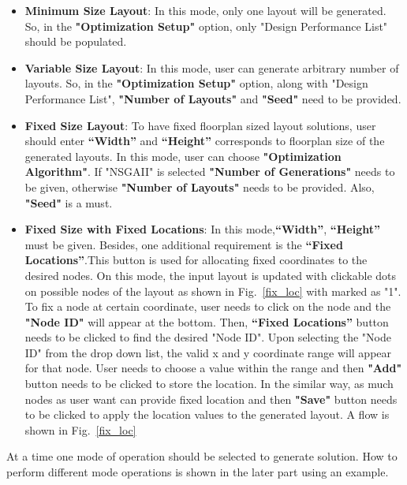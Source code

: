 \documentclass[11pt]{article}
\begin{document}
\begin{itemize}
    \item \textbf{Minimum Size Layout}: In this mode, only one layout will be generated. So, in the \textbf{"Optimization Setup"} option, only "Design Performance List" should be populated.
    \item \textbf{Variable Size Layout}: In this mode, user can generate arbitrary number of layouts. So, in the \textbf{"Optimization Setup"} option, along with "Design Performance List", \textbf{"Number of Layouts"} and \textbf{"Seed"} need to be provided.
    \item \textbf{Fixed Size Layout}: To have fixed floorplan sized layout solutions, user should enter \textbf{“Width”} and \textbf{“Height”} corresponds to floorplan size of the generated layouts. In this mode, user can choose \textbf{"Optimization Algorithm"}. If "NSGAII" is selected \textbf{"Number of Generations"} needs to be given, otherwise \textbf{"Number of Layouts"} needs to be provided. Also, \textbf{"Seed"} is a must.
    \item \textbf{Fixed Size with Fixed Locations}: In this mode,\textbf{“Width”}, \textbf{“Height”} must be given. Besides, one additional requirement is the \textbf{“Fixed Locations”}.This button is used for allocating fixed coordinates to the desired nodes. On this mode, the input layout is updated with clickable dots on possible nodes of the layout as shown in Fig.~\ref{fix_loc} with marked as "1". To fix a node at certain coordinate, user needs to click on the node and the \textbf{"Node ID"} will appear at the bottom. Then, \textbf{“Fixed Locations”} button needs to be clicked to find the desired "Node ID". Upon selecting the "Node ID" from the drop down list, the valid x and y coordinate range will appear for that node. User needs to choose a value within the range and then \textbf{"Add"} button needs to be clicked to store the location. In the similar way, as much nodes as user want can provide fixed location and then \textbf{"Save"} button needs to be clicked to apply the location values to the generated layout. A flow is shown in Fig.~\ref{fix_loc}
\end{itemize}

At a time one mode of operation should be selected to generate solution.
How to perform different mode operations is shown in the later part using an example.
\end{document}
